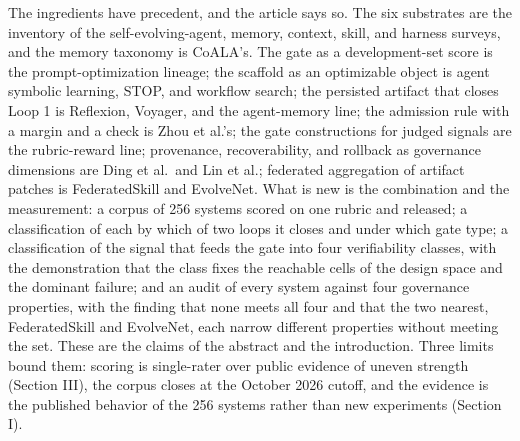 \documentclass[
]{article}
\newcounter{none} %
\begin{document}
The ingredients have precedent, and the article says so. The six
substrates are the inventory of the self-evolving-agent, memory,
context, skill, and harness surveys, and the memory taxonomy is CoALA's.
The gate as a development-set score is the prompt-optimization lineage;
the scaffold as an optimizable object is agent symbolic learning, STOP,
and workflow search; the persisted artifact that closes Loop 1 is
Reflexion, Voyager, and the agent-memory line; the admission rule with a
margin and a check is Zhou et al.'s; the gate constructions for judged
signals are the rubric-reward line; provenance, recoverability, and
rollback as governance dimensions are Ding et al.~and Lin et al.;
federated aggregation of artifact patches is FederatedSkill and
EvolveNet. What is new is the combination and the measurement: a corpus
of 256 systems scored on one rubric and released; a classification of
each by which of two loops it closes and under which gate type; a
classification of the signal that feeds the gate into four verifiability
classes, with the demonstration that the class fixes the reachable cells
of the design space and the dominant failure; and an audit of every
system against four governance properties, with the finding that none
meets all four and that the two nearest, FederatedSkill and EvolveNet,
each narrow different properties without meeting the set. These are the
claims of the abstract and the introduction. Three limits bound them:
scoring is single-rater over public evidence of uneven strength (Section
III), the corpus closes at the October 2026 cutoff, and the evidence is
the published behavior of the 256 systems rather than new experiments
(Section I).


\end{document}
